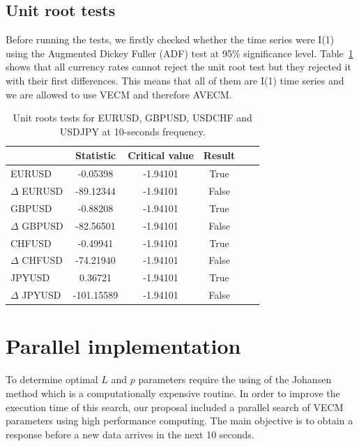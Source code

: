 \subsection{Unit root tests} \label{sec:unitroot}
Before running the tests, we firstly checked whether the time series were
I(1) using the Augmented Dickey Fuller (ADF) test at 95\% significance level.
Table~\ref{tab:adf} shows that all currency rates cannot reject the unit root
test but they rejected it with their first differences. This means that all of
them are I(1) time series and we are allowed to use VECM and therefore AVECM.

\begin{table}[h!]
\begin{center}
\begin{tabular}{|l|c|c|c|c|c|}
\hline
& \textbf{Statistic} & \textbf{Critical value} & \textbf{Result}\\
\hline
EURUSD          &  -0.05398   & -1.94101 & True       \\
$\Delta$ EURUSD & -89.12344   & -1.94101 & False       \\
GBPUSD          &  -0.88208   & -1.94101 & True          \\
$\Delta$ GBPUSD & -82.56501   & -1.94101 & False       \\
CHFUSD          & -0.49941    & -1.94101 & True         \\
$\Delta$ CHFUSD & -74.21940   & -1.94101 & False       \\
JPYUSD          &  0.36721    & -1.94101 & True        \\
$\Delta$ JPYUSD & -101.15589  & -1.94101 & False     \\ 
\hline
\end{tabular}
\end{center}
\caption{Unit roots tests for EURUSD, GBPUSD, USDCHF and USDJPY at 10-seconds
frequency.}
\label{tab:adf}
\end{table}


\section{Parallel implementation} \label{sec:paralell}

To determine optimal $L$ and $p$ parameters require the using of the Johansen
method which is a computationally expensive routine. 
In order to improve the execution time of this search, our proposal included
a parallel search of VECM parameters using high performance computing.
The main objective is to obtain a response before a new data arrives in
the next 10 seconds.

